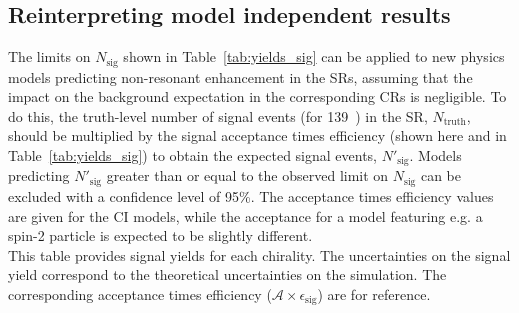 \clearpage

\subsection{Reinterpreting model independent results}

The limits on $N_\text{sig}$ shown in Table~\ref{tab:yields_sig} can be applied to new physics models predicting non-resonant enhancement in the SRs, assuming that the impact on the background expectation in the corresponding CRs is negligible.
To do this, the truth-level number of signal events (for 139~\fb) in the SR, $N_\text{truth}$, should be multiplied by the signal acceptance times efficiency (shown here and in Table~\ref{tab:yields_sig}) to obtain the expected signal events, $N'_\text{sig}$.
Models predicting $N'_\text{sig}$ greater than or equal to the observed limit on $N_\text{sig}$ can be excluded with a confidence level of 95\%.
The acceptance times efficiency values are given for the CI models, while the acceptance for a model featuring e.g. a spin-2 particle is expected to be slightly different.
\\
    This table provides signal yields for each chirality. The uncertainties on the signal yield correspond to the theoretical uncertainties on the simulation. The corresponding acceptance times efficiency ($\mathcal{A}\times\epsilon_\textrm{sig}$) are for reference.

